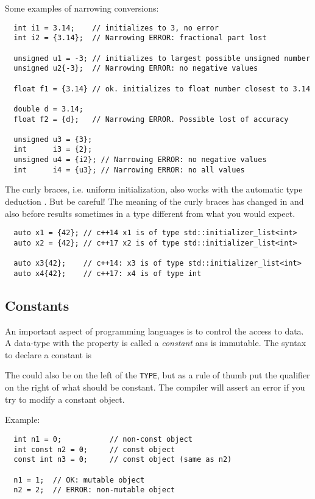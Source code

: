 Some examples of narrowing conversions:
\begin{verbatim}
  int i1 = 3.14;    // initializes to 3, no error
  int i2 = {3.14};  // Narrowing ERROR: fractional part lost

  unsigned u1 = -3; // initializes to largest possible unsigned number
  unsigned u2{-3};  // Narrowing ERROR: no negative values

  float f1 = {3.14} // ok. initializes to float number closest to 3.14

  double d = 3.14;
  float f2 = {d};   // Narrowing ERROR. Possible lost of accuracy

  unsigned u3 = {3};
  int      i3 = {2};
  unsigned u4 = {i2}; // Narrowing ERROR: no negative values
  int      i4 = {u3}; // Narrowing ERROR: no all values
\end{verbatim}

\begin{rem}
  The\marginpar{[\cxx{17}]} curly braces, i.e. uniform initialization, also works with the automatic type deduction . But be careful! The meaning
  of the curly braces has changed in  and also before results sometimes in a type different from what you would expect.
  \begin{verbatim}
  auto x1 = {42}; // c++14 x1 is of type std::initializer_list<int>
  auto x2 = {42}; // c++17 x2 is of type std::initializer_list<int>

  auto x3{42};    // c++14: x3 is of type std::initializer_list<int>
  auto x4{42};    // c++17: x4 is of type int
  \end{verbatim}
\end{rem}

\subsection{Constants\label{sec:const}}
An important aspect of programming languages is to control the access to data. A data-type with the property 
is called a \emph{constant} ans is immutable. The syntax to declare a constant is


The  could also be on the left of the \texttt{TYPE}, but as a rule of thumb put the qualifier  on the right of what
should be constant. The compiler will assert an error if you try to modify a constant object.

Example:
\begin{verbatim}
  int n1 = 0;           // non-const object
  int const n2 = 0;     // const object
  const int n3 = 0;     // const object (same as n2)

  n1 = 1;  // OK: mutable object
  n2 = 2;  // ERROR: non-mutable object
\end{verbatim}

